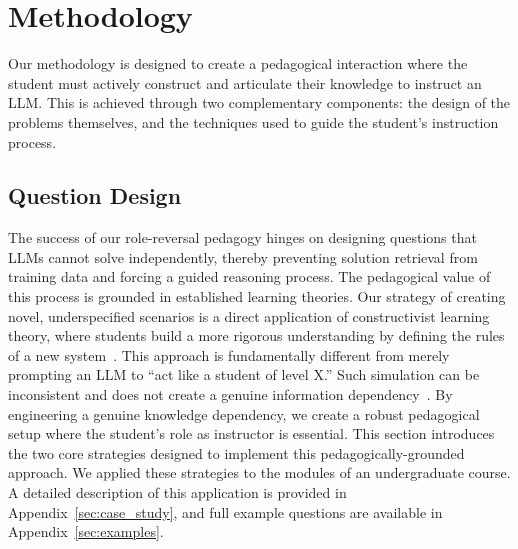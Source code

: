 \documentclass{article} %
\begin{document}
\section{Methodology}
\label{sec:methodology}
Our methodology is designed to create a pedagogical interaction where the student must actively construct and articulate their knowledge to instruct an LLM. This is achieved through two complementary components: the design of the problems themselves, and the techniques used to guide the student's instruction process.


\subsection{Question Design}
\label{sec:question_design}


The success of our role-reversal pedagogy hinges on designing questions that LLMs cannot solve independently, thereby preventing solution retrieval from training data and forcing a guided reasoning process. The pedagogical value of this process is grounded in established learning theories. Our strategy of creating novel, underspecified scenarios is a direct application of constructivist learning theory, where students build a more rigorous understanding by defining the rules of a new system~\citep{Papert1991Constructionism, kafai1996constructionism}. 
This approach is fundamentally different from merely prompting an LLM to ``act like a student of level X.'' Such simulation can be inconsistent and does not create a genuine information dependency~\citep{Mannekote2024LLMLearnerSim, Kumar2025CounterfactualLLMs}. By engineering a genuine knowledge dependency, we create a robust pedagogical setup where the student's role as instructor is essential. This section introduces the two core strategies designed to implement this pedagogically-grounded approach. We applied these strategies to the modules of an undergraduate course. A detailed description of this application is provided in Appendix~\ref{sec:case_study}, and full example questions are available in Appendix~\ref{sec:examples}.

 
\end{document}
